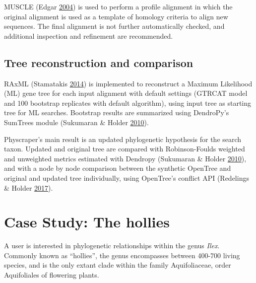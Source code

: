 \documentclass[]{article}
\begin{document}
MUSCLE (Edgar \protect\hyperlink{ref-edgar2004muscle}{2004}) is used to perform a profile alignment in which the original alignment is used as a template of homology criteria to align new sequences.
The final alignment is not further automatically checked, and additional inspection and refinement are recommended.

\hypertarget{tree-reconstruction-and-comparison}{%
\subsection{Tree reconstruction and comparison}\label{tree-reconstruction-and-comparison}}

RAxML (Stamatakis \protect\hyperlink{ref-stamatakis2014raxml}{2014}) is implemented to reconstruct a Maximum Likelihood (ML) gene tree for each input alignment with default settings (GTRCAT model and 100 bootstrap replicates with default algorithm), using input tree as starting tree for ML searches.
Bootstrap results are summarized using DendroPy's SumTrees module (Sukumaran \& Holder \protect\hyperlink{ref-sukumaran2010dendropy}{2010}).

Physcraper's main result is an updated phylogenetic hypothesis for the search taxon.
Updated and original tree are compared with Robinson-Foulds weighted and unweighted metrics estimated with Dendropy (Sukumaran \& Holder \protect\hyperlink{ref-sukumaran2010dendropy}{2010}), and with a node by node comparison between the synthetic OpenTree and original and updated tree individually, using OpenTree's conflict API (Redelings \& Holder \protect\hyperlink{ref-redelings2017supertree}{2017}).

\hypertarget{case-study-the-hollies}{%
\section{Case Study: The hollies}\label{case-study-the-hollies}}

A user is interested in phylogenetic relationships within the genus \emph{Ilex}. Commonly known as ``hollies'', the genus encompasses between 400-700 living species, and is the only extant clade within the family Aquifoliaceae, order Aquifoliales of flowering plants.
\end{document}
